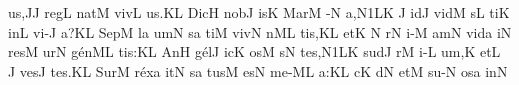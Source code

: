 \sgn {}u{s,}\punctum J\augmentum J\egn
\spatium
\sgn r{e}g\punctum L\egn
\sgn nat\punctum M\egn
\spatium
\sgn v{i}v\punctum L\egn
\sgn {}u{s.}\punctum K\augmentum L\egn
\spatium
\divisiofinalis
\spatium
\sgn Dic\punctum H\egn
\spatium
\sgn n{o}b\punctum J\egn
\sgn {}is\punctum K\egn
\spatium
\sgn Mar\punctum M\egn
\sgn {}{\'\i}-\punctum N\egn
\sgn {}a,\episem N1\clivis LK\egn
\spatium
\divisiominima
\spatium
{}\Internote
\custos J
\lineaproxima
{}id\punctum J\egn
\spatium
\sgn vid\punctum M\egn
\sgn {}{\'\i}s\punctum L\egn
\sgn ti{}\punctum K\egn
\spatium
\sgn {}in\punctum L\egn
\spatium
\sgn v{i}-\punctum J\egn
\sgn {}a?\punctum K\augmentum L\egn
\spatium
\divisiofinalis
\spatium
\sgn Sep\punctum M\egn
{}l\punctum a\egn
{}um\punctum N\egn
\spatium
{}s\punctum a\egn
\sgn ti{}\punctum M\egn
\spatium
\sgn viv\punctum N\egn
{}n\cephalicus ML\egn
\sgn ti{s,}\punctum K\augmentum L\egn
\spatium
\divisiominor
\spatium
\sgn {}et\punctum K\egn
\spatium
\custos N
\Internote
{}
\lineaproxima
{}r\punctum N\egn
\sgn {}i-\punctum M\egn
\sgn {}am\sengl{}\punctum N\egn
\spatium
\sgn v{i}d\punctum a\egn
\sgn {}i{}\punctum N\egn
\spatium
\sgn res\punctum M\egn
\sgn {}ur\punctum N\egn
\sgn g{\'e}n\cephalicus ML\egn
\sgn ti{s:}\punctum K\augmentum L\egn
\spatium
\divisiofinalis
\spatium
\sgn {}An\punctum H\egn
\sgn g{\'e}l\punctum J\egn
\sgn {}ic\punctum K\egn
\sgn {}os\punctum M\egn
\spatium
{}s\punctum N\egn
\sgn te{s,}\episem N1\clivis LK\egn
\spatium
\divisiominima
\spatium
\sgn sud\punctum J\egn
{}r\punctum M\egn
\sgn {}i-\punctum L\egn
\sgn {}u{m,}\sengl{}\punctum K\egn
\spatium
\sgn {}et\punctum L\egn
\spatium
\custos J
\Internote
{}
\lineaproxima
\sgn v{e}s\punctum J\egn
\sgn te{s.}\engl{}\punctum K\augmentum L\egn
\spatium
\divisiofinalis
\spatium
\sgn Sur\punctum M\egn
\sgn r{\'e}x\punctum a\egn
\sgn {}it\punctum N\egn
\spatium
{}s\punctum a\egn
\sgn tus\punctum M\egn
\spatium
{}es\punctum N\egn
\spatium
\sgn m{e}-\clivis ML\egn
\sgn {}a:\punctum K\augmentum L\egn
\spatium
\divisiominor
\spatium
{}c\punctum K\egn
{}d\punctum N\egn
\sgn {}et\punctum M\egn
\spatium
\sgn s{u}-\engl{}\punctum N\egn
\sgn {}os\punctum a\egn
\spatium
\sgn {}in\punctum N\egn
